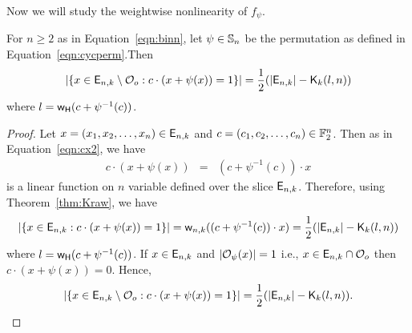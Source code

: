 \documentclass{llncs}
\begin{document}
Now we will study the weightwise nonlinearity of $f_\psi$.
\begin{lemma} \label{lem:setSize_k}
For $n \geq 2$ as in Equation~\ref{eqn:binn}, let $\psi \in \mathbb{S}_n$ be the permutation as defined in Equation~\ref{eqn:cycperm}.Then 
$$\left| \{x \in \mathsf{E}_{n,k} \setminus \mathcal{O}_o : c \cdot (x + \psi(x))= 1\} \right| 
= \frac{1}{2} (|\mathsf{E}_{n,k}| - \mathsf{K}_{k}(l,n))$$
where $l = \mathsf{w_H}(c+\psi^{-1}(c))$.
\end{lemma} 
\begin{proof}
Let $x = (x_1,x_2, \ldots,x_n) \in \mathsf{E}_{n,k}$ and $c = (c_1,c_2,\ldots,c_n) \in \mathbb{F}_2^n$. Then as in Equation~\ref{eqn:cx2}, we have 
\begin{eqnarray*}
c \cdot (x+\psi(x)) & = & (c+\psi^{-1}(c)) \cdot x \label{eqn:cxk2}
\end{eqnarray*}
is a linear function on $n$ variable defined over the slice $\mathsf{E}_{n,k}$.
Therefore, using Theorem~\ref{thm:Kraw}, we have
$$\left| \{x \in \mathsf{E}_{n,k} : c \cdot (x + \psi(x))= 1\} \right| = \mathsf{w}_{n,k}((c+\psi^{-1}(c)) \cdot x) = \frac{1}{2} (|\mathsf{E}_{n,k}| - \mathsf{K}_{k}(l,n))$$
where $l = \mathsf{w_H}(c+\psi^{-1}(c))$.
If $x \in \mathsf{E}_{n,k}$ and $|\mathcal{O}_\psi(x)| = 1$ i.e., $x \in \mathsf{E}_{n,k} \cap \mathcal{O}_o$ then $c \cdot (x+\psi(x)) = 0$. Hence,
$$\left| \{x \in \mathsf{E}_{n,k} \setminus \mathcal{O}_o : c \cdot (x + \psi(x))= 1\} \right| 
= \frac{1}{2} (|\mathsf{E}_{n,k}| - \mathsf{K}_{k}(l,n)).$$
\end{proof}
\end{document}
